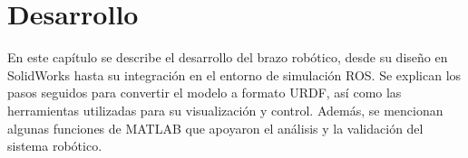 \chapter{Desarrollo} \label{chap:desarrollo}
En este capítulo se describe el desarrollo del brazo robótico, desde su diseño en SolidWorks hasta su integración en el entorno de simulación ROS. Se explican los pasos seguidos para convertir el modelo a formato URDF, así como las herramientas utilizadas para su visualización y control. Además, se mencionan algunas funciones de MATLAB que apoyaron el análisis y la validación del sistema robótico.

